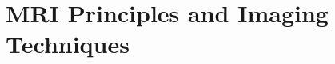 \chapter{MRI Principles and Imaging Techniques}\label{chap:2}

\ifpdf
    \graphicspath{{2_modality/figures/}}
\else
    \graphicspath{{2_modality/figures/}}
\fi





